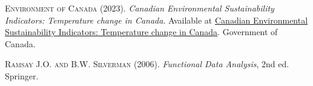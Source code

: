 \documentclass[aoas]{imsart}\usepackage[]{graphicx}\usepackage[]{xcolor}
\begin{document}

\begin{thebibliography}{1}
\textsc{Environment of Canada} (2023). \textit{Canadian Environmental Sustainability Indicators: Temperature change in Canada}. Available at \href{https://www.canada.ca/en/environment-climate-change/services/environmental-indicators/temperature-change.html}{Canadian Environmental Sustainability Indicators: Temperature change in Canada}. Government of Canada.

\textsc{Ramsay J.O. and B.W. Silverman} (2006). \textit{Functional Data Analysis}, 2nd ed. Springer.
\end{thebibliography}
\end{document}
